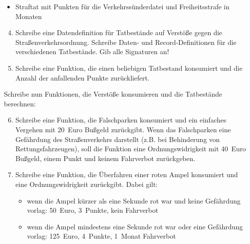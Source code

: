\begin{aufgabe}
\begin{itemize}
  \item Straftat mit Punkten für die Verkehrssünderdatei und
    Freiheitsstrafe in Monaten
  \end{itemize}
  
  \begin{enumerate} \setcounter{enumii}{3}
  \item Schreibe eine Datendefinition für
    Tatbestände auf Verstöße gegen die Straßenverkehrsordnung.
    Schreibe Daten- und Record-Definitionen für die verschiedenen
    Tatbestände.  Gib alle Signaturen an!

  \item Schreibe eine Funktion, die einen
    beliebigen Tatbestand konsumiert und die Anzahl der anfallenden
    Punkte zurückliefert.
  \end{enumerate}

  Schreibe nun Funktionen, die Verstöße konsumieren und die
  Tatbestände berechnen:

  \begin{enumerate} \setcounter{enumii}{5}
  \item Schreibe eine Funktion, die Falschparken
    konsumiert und ein einfaches Vergehen mit 20~Euro Bußgeld zurückgibt.
    Wenn das Falschparken eine Gefährdung des Straßenverkehrs
    darstellt (z.B.  bei Behinderung von Rettungsfahrzeugen),
    soll die Funktion eine Ordnungswidrigkeit mit 40~Euro Bußgeld,
    einem Punkt und keinem Fahrverbot zurückgeben.

  \item Schreibe eine Funktion, die Überfahren
    einer roten Ampel konsumiert und eine Ordnungswidrigkeit
    zurückgibt.  Dabei gilt:
    \begin{itemize}
    \item wenn die Ampel kürzer als eine Sekunde rot war und keine
      Gefährdung vorlag: 50~Euro, 3~Punkte, kein Fahrverbot
    \item wenn die Ampel mindestens eine Sekunde rot war oder eine
      Gefährdung vorlag: 125~Euro, 4~Punkte, 1~Monat Fahrverbot
    \end{itemize}


\end{enumerate}
\end{aufgabe}
